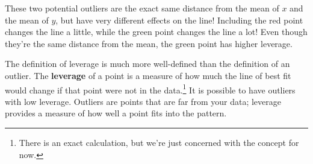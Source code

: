 \documentclass[
  letterpaper,
  DIV=11,
  numbers=noendperiod]{scrreprt}
\begin{document}
These two potential outliers are the exact same distance from the mean
of \(x\) and the mean of \(y\), but have very different effects on the
line! Including the red point changes the line a little, while the green
point changes the line a lot! Even though they're the same distance from
the mean, the green point has higher leverage.

The definition of leverage is much more well-defined than the definition
of an outlier. The \textbf{leverage} of a point is a measure of how much
the line of best fit would change if that point were not in the
data.\footnote{There is an exact calculation, but we're just concerned
  with the concept for now.} It is possible to have outliers with low
leverage. Outliers are points that are far from your data; leverage
provides a measure of how well a point fits into the pattern.
\end{document}
